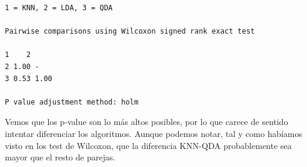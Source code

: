 \begin{verbatim}
1 = KNN, 2 = LDA, 3 = QDA

Pairwise comparisons using Wilcoxon signed rank exact test 

1    2   
2 1.00 -   
3 0.53 1.00
    
P value adjustment method: holm 
\end{verbatim}

Vemos que los p-value son lo más altos posibles, por lo que carece de sentido intentar diferenciar los algoritmos. Aunque podemos notar, tal y como habíamos visto en los test de Wilcoxon, que la diferencia KNN-QDA probablemente sea mayor que el resto de parejas.